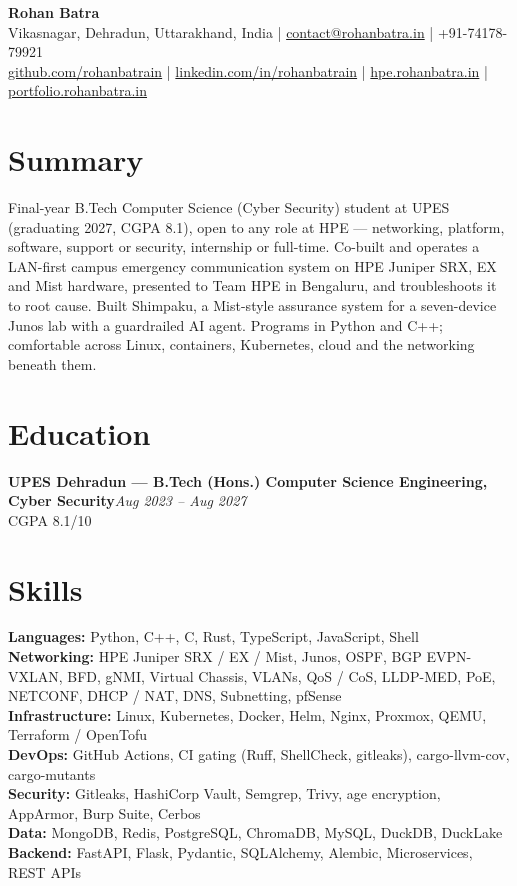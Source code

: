 \documentclass[10pt,a4paper]{article}
\newcommand{\entry}[3]{%
  \textbf{#1}\hfill\textit{\small #2}\\[-0.15em]
  {\small #3}\par\vspace{0.08em}%
}
\begin{document}
\begin{center}
  {\LARGE\bfseries Rohan Batra}\\[0.25em]
  {\small
    Vikasnagar, Dehradun, Uttarakhand, India \;|\; \href{mailto:contact@rohanbatra.in}{contact@rohanbatra.in} \;|\; +91-74178-79921\\[0.15em]
    \href{https://github.com/rohanbatrain}{github.com/rohanbatrain} \;|\; \href{https://linkedin.com/in/rohanbatrain}{linkedin.com/in/rohanbatrain} \;|\; \href{https://hpe.rohanbatra.in}{hpe.rohanbatra.in} \;|\; \href{https://portfolio.rohanbatra.in}{portfolio.rohanbatra.in}
  }
\end{center}

\section{Summary}
Final-year B.Tech Computer Science (Cyber Security) student at UPES (graduating 2027, CGPA 8.1), open to any role at HPE --- networking, platform, software, support or security, internship or full-time. Co-built and operates a LAN-first campus emergency communication system on HPE Juniper SRX, EX and Mist hardware, presented to Team HPE in Bengaluru, and troubleshoots it to root cause. Built Shimpaku, a Mist-style assurance system for a seven-device Junos lab with a guardrailed AI agent. Programs in Python and C++; comfortable across Linux, containers, Kubernetes, cloud and the networking beneath them.

\section{Education}
\entry{UPES Dehradun --- B.Tech (Hons.) Computer Science Engineering, Cyber Security}{Aug 2023 -- Aug 2027}{CGPA 8.1/10}

\section{Skills}
\textbf{Languages:} Python, C++, C, Rust, TypeScript, JavaScript, Shell\\
\textbf{Networking:} HPE Juniper SRX / EX / Mist, Junos, OSPF, BGP EVPN-VXLAN, BFD, gNMI, Virtual Chassis, VLANs, QoS / CoS, LLDP-MED, PoE, NETCONF, DHCP / NAT, DNS, Subnetting, pfSense\\
\textbf{Infrastructure:} Linux, Kubernetes, Docker, Helm, Nginx, Proxmox, QEMU, Terraform / OpenTofu\\
\textbf{DevOps:} GitHub Actions, CI gating (Ruff, ShellCheck, gitleaks), cargo-llvm-cov, cargo-mutants\\
\textbf{Security:} Gitleaks, HashiCorp Vault, Semgrep, Trivy, age encryption, AppArmor, Burp Suite, Cerbos\\
\textbf{Data:} MongoDB, Redis, PostgreSQL, ChromaDB, MySQL, DuckDB, DuckLake\\
\textbf{Backend:} FastAPI, Flask, Pydantic, SQLAlchemy, Alembic, Microservices, REST APIs
\end{document}
